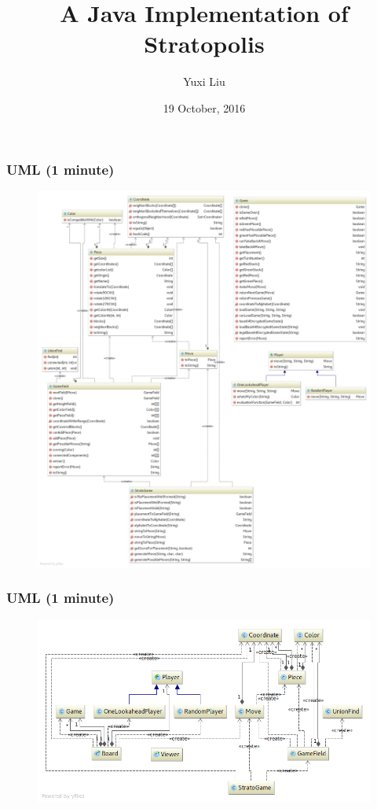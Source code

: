 \documentclass{beamer}
\title[Java Stratopolis]{A Java Implementation of Stratopolis} %
\author{Yuxi Liu}
\date{19 October, 2016}
\begin{document}
\begin{frame}
\titlepage %
\end{frame}


\begin{frame}
\frametitle{UML (1 minute)}
\begin{figure}
\includegraphics[width=0.6\linewidth]{uml}
\end{figure}
\end{frame}

\begin{frame}
\frametitle{UML (1 minute)}
\begin{figure}
\includegraphics[width=1.1\linewidth]{uml_simple}
\end{figure}
\end{frame}
\end{document}
